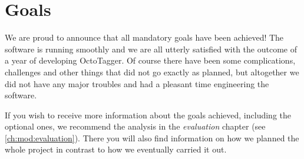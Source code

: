 \section{Goals}
We are proud to announce that all mandatory goals have been achieved! The software is running smoothly and we are all utterly satisfied with the outcome of a year of developing OctoTagger. Of course there have been some complications, challenges and other things that did not go exactly as planned, but altogether we did not have any major troubles and had a pleasant time engineering the software.

If you wish to receive more information about the goals achieved, including the optional ones, we recommend the analysis in the \textit{evaluation} chapter (see \cref{ch:mod:evaluation}). There you will also find information on how we planned the whole project in contrast to how we eventually carried it out.




















